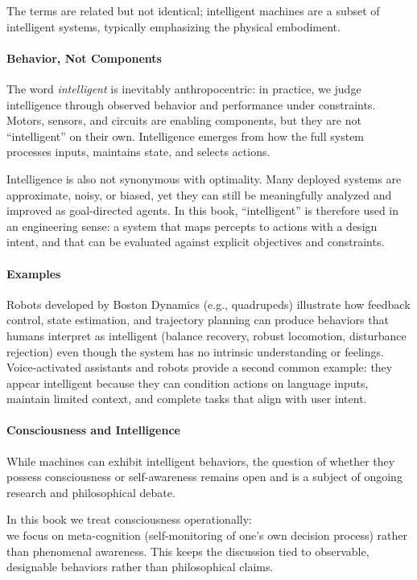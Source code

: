 The terms are related but not identical; intelligent machines are a subset of intelligent systems, typically emphasizing the physical embodiment.

\paragraph{Behavior, Not Components}

The word \emph{intelligent} is inevitably anthropocentric: in practice, we judge intelligence through observed behavior and performance under constraints. Motors, sensors, and circuits are enabling components, but they are not ``intelligent'' on their own. Intelligence emerges from how the full system processes inputs, maintains state, and selects actions.

Intelligence is also not synonymous with optimality. Many deployed systems are approximate, noisy, or biased, yet they can still be meaningfully analyzed and improved as goal-directed agents. In this book, ``intelligent'' is therefore used in an engineering sense: a system that maps percepts to actions with a design intent, and that can be evaluated against explicit objectives and constraints.

\paragraph{Examples}

Robots developed by Boston Dynamics (e.g., quadrupeds) illustrate how feedback control, state estimation, and trajectory planning can produce behaviors that humans interpret as intelligent (balance recovery, robust locomotion, disturbance rejection) even though the system has no intrinsic understanding or feelings. Voice-activated assistants and robots provide a second common example: they appear intelligent because they can condition actions on language inputs, maintain limited context, and complete tasks that align with user intent.

\paragraph{Consciousness and Intelligence}

While machines can exhibit intelligent behaviors, the question of whether they possess consciousness or self-awareness remains open and is a subject of ongoing research and philosophical debate.

In this book we treat consciousness operationally:\\
we focus on meta-cognition (self\hyp{}monitoring of one's own decision process) rather than phenomenal awareness. This keeps the discussion tied to observable, designable behaviors rather than philosophical claims.

